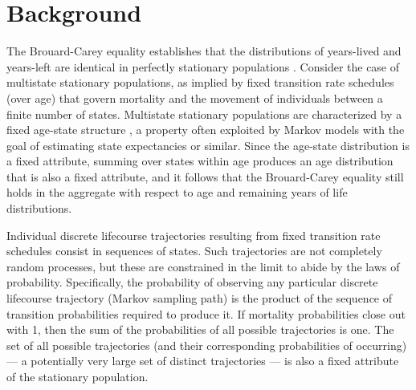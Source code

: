 \documentclass[12pt,oneside,a4paper]{article}
\theoremstyle{definition}
\begin{document}
\section{Background}
The Brouard-Carey equality establishes that the distributions of years-lived and years-left are identical in perfectly stationary populations
\citep{brouard1989mouvements,Vaupel2009,rao2014,villavicencioRiffeSymmetires2016}. Consider the case of multistate stationary populations, as implied by fixed transition rate schedules (over age) that govern mortality and the movement of individuals between a finite number of states. Multistate stationary populations are characterized by a fixed age-state structure \citep{perron1907theorie,frobenius1912matrizen}, a property often exploited by Markov
models with the goal of estimating state expectancies or similar. Since the age-state distribution is a fixed attribute, summing over states within age produces an age distribution that is also a fixed attribute, and it follows that the Brouard-Carey equality still holds in the aggregate with respect to age and remaining years of life distributions. 

Individual discrete lifecourse trajectories resulting from fixed transition rate schedules consist in sequences of states. Such trajectories are not completely random processes, but these are constrained in the limit to abide by the laws of probability. Specifically, the probability of observing any particular discrete lifecourse trajectory (Markov sampling path) is the product of the sequence of transition probabilities required to produce it. If mortality probabilities close out with 1, then the sum of the probabilities of all possible trajectories is one. The set of all possible trajectories (and their corresponding probabilities of occurring) --- a potentially very large set of distinct trajectories --- is also a fixed attribute of the stationary population. 
\end{document}
